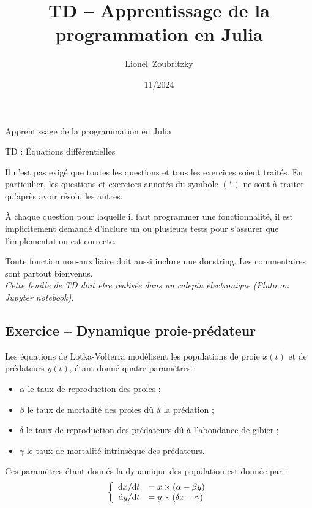 \documentclass{article}
\title{TD -- Apprentissage de la programmation en Julia}
\author{Lionel~Zoubritzky}
\date{11/2024}
\newcounter{loop}
\newcounter{numEx}
\newcommand{\exo}[1]{
	\stepcounter{numEx}
	\setcounter{loop}{0}
	\subsection*{Exercice \arabic{numEx} -- #1}
}
\newenvironment{disj}[1]{\left\{\begin{array}{#1}} {\end{array}\right.}
\begin{document}
	
\begin{center}
	\Large Apprentissage de la programmation en Julia
	
	TD  : Équations différentielles
	\vspace{2em}
\end{center}

Il n'est pas exigé que toutes les questions et tous les exercices soient traités. En particulier, les questions et exercices annotés du symbole $(*)$ ne sont à traiter qu'après avoir résolu les autres.

À chaque question pour laquelle il faut programmer une fonctionnalité, il est implicitement demandé d'inclure un ou plusieurs tests pour s'assurer que l'implémentation est correcte.

Toute fonction non-auxiliaire doit aussi inclure une docstring. Les commentaires sont partout bienvenus.\\

\textsl{Cette feuille de TD doit être réalisée dans un calepin électronique (Pluto ou Jupyter notebook).}


\exo{Dynamique proie-prédateur}


Les équations de Lotka-Volterra modélisent les populations de proie $x(t)$ et de prédateurs $y(t)$, étant donné quatre paramètres :
\begin{itemize}
	\item $\alpha$ le taux de reproduction des proies ;
	\item $\beta$ le taux de mortalité des proies dû à la prédation ;
	\item $\delta$ le taux de reproduction des prédateurs dû à l'abondance de gibier ;
	\item $\gamma$ le taux de mortalité intrinsèque des prédateurs.
\end{itemize}

Ces paramètres étant donnés la dynamique des population est donnée par :
\[\begin{disj}{rl}
	\text dx/\text dt &= x\times(\alpha - \beta y)\\
	\text dy/\text dt &= y\times(\delta x - \gamma)
\end{disj}\]
\end{document}
